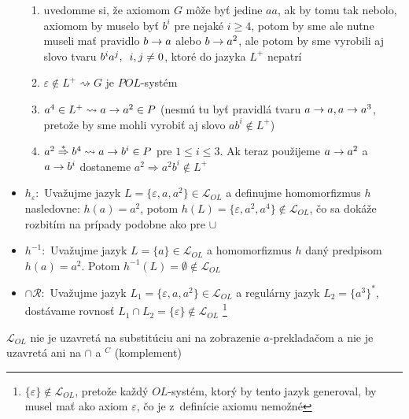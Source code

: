 \begin{dokaz}
\begin{itemize}
        \begin{enumerate}
        \item uvedomme si, že axiomom $G$ môže byť jedine $aa$, ak by tomu
            tak nebolo, axiomom by muselo byť $b^{i}$ pre nejaké $i\geq4$,
            potom by sme ale nutne museli mať pravidlo $b\rightarrow a$ alebo $b\rightarrow
            a^{2}$, ale potom by sme vyrobili aj slovo tvaru $b^{i}a^{j},\enspace
            i,j\neq0$, ktoré do jazyka $L^{+}$ nepatrí

        \item $\varepsilon\not\in L^{+}\rightsquigarrow G$ je $POL$-systém

        \item $a^{4}\in L^{+}\rightsquigarrow a\rightarrow a^{2}\in P$ (nesmú tu byť
            pravidlá tvaru $a\rightarrow a,a\rightarrow a^{3}$, pretože by sme mohli vyrobiť
            aj slovo $ab^{i}\not\in L^{+}$)

        \item $a^{2}\overset{*}\Rightarrow b^{4}\rightsquigarrow a\rightarrow b^{i}\in
            P$ pre $1\leq i\leq3$. Ak teraz použijeme $a\rightarrow a^{2}$ a $a\rightarrow
            b^{i}$ dostaneme $a^{2}\Rightarrow a^{2}b^{i}\not\in L^{+}$
        \end{enumerate}

    \item $h_{\varepsilon} :$ Uvažujme jazyk
        $L=\{\varepsilon,a,a^{2}\}\in\mathcal{L}_{OL}$ a definujme
        homomorfizmus $h$ nasledovne: $h(a)=a^{2}$, potom
        $h(L)=\{\varepsilon,a^{2},a^{4}\}\not\in\mathcal{L}_{OL}$, čo sa
        dokáže rozbitím na prípady podobne ako pre $\cup$
        \item $h^{-1} :$ Uvažujme jazyk $L=\{a\}\in\mathcal{L}_{OL}$ a
        homomorfizmus $h$ daný predpisom $h(a)=a^{2}$. Potom
        $h^{-1}(L)=\emptyset\not\in\mathcal{L}_{OL}$
        \item $\cap\mathcal{R} :$ Uvažujme jazyk
        $L_{1}=\{\varepsilon,a,a^{2}\}\in\mathcal{L}_{OL}$ a regulárny
        jazyk $L_{2}=\{a^{3}\}^{*}$, dostávame rovnosť $L_{1}\cap
        L_{2}=\{\varepsilon\}\not\in\mathcal{L}_{OL}$
        \footnote{$\{\varepsilon\}\not\in\mathcal{L}_{OL}$, pretože každý
        $OL$-systém, ktorý by tento jazyk generoval, by musel mať ako
        axiom $\varepsilon$, čo je \mbox{z definície} axiomu nemožné}
    \end{itemize}
\end{dokaz}

\begin{dosledok}
    $\mathcal{L}_{OL}$ nie je uzavretá na substitúciu ani na
    zobrazenie $a$-prekladačom a nie je uzavretá ani na $\cap$ a
    $^{C}$ (komplement)
\end{dosledok}

